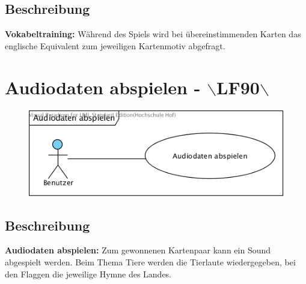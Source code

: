 \subsection{Beschreibung}
\textbf{Vokabeltraining: } Während des Spiels wird bei übereinstimmenden Karten das englische Equivalent zum jeweiligen Kartenmotiv abgefragt.


\section{Audiodaten abspielen - $\backslash$LF90$\backslash$}
\begin{figure}[!h]
	\centering
    \includegraphics[width=\textwidth]{./Audiodaten.png}
	\label{layout_gesamt}
\end{figure}

\subsection{Beschreibung}
\textbf{Audiodaten abspielen: } Zum gewonnenen Kartenpaar kann ein Sound abgespielt werden. Beim Thema Tiere werden die Tierlaute wiedergegeben, bei den Flaggen die jeweilige Hymne des Landes.

